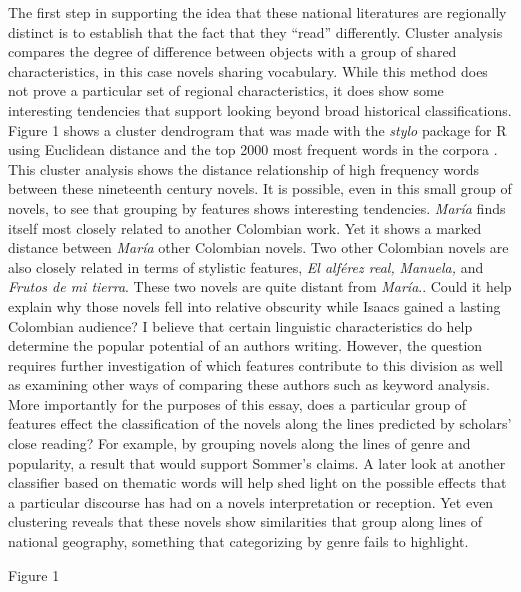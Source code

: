 The first step in supporting the idea that these national literatures are regionally distinct is to establish that the fact that they \enquote{read} differently.
Cluster analysis compares the degree of difference between objects with a group of shared characteristics, in this case novels sharing vocabulary.
While this method does not prove a particular set of regional characteristics, it does show some interesting tendencies that support looking beyond broad historical classifications. 
Figure 1 shows a cluster dendrogram that was made with the \textit{stylo} package for R using Euclidean distance and the top 2000 most frequent words in the corpora \autocite{Eder2013, RCT2014}.
This cluster analysis shows the distance relationship of high frequency words between these nineteenth century novels.
It is possible, even in this small group of novels, to see that grouping by features shows interesting tendencies. 
\textit{María} finds itself most closely related to another Colombian work.
Yet it shows a marked distance between \textit{María} other Colombian novels.
Two other Colombian novels are also closely related in terms of stylistic features, \textit{El alférez real,} \textit{Manuela,} and \textit{Frutos de mi tierra}.
These two novels are quite distant from \textit{María}..
Could it help explain why those novels fell into relative obscurity while Isaacs gained a lasting Colombian audience?
I believe that certain linguistic characteristics do help determine the popular potential of an authors writing.
However, the question requires further investigation of which features contribute to this division as well as examining other ways of comparing these authors such as keyword analysis.
More importantly for the purposes of this essay, does a particular group of features effect the classification of the novels along the lines predicted by scholars' close reading?
For example, by grouping novels along the lines of genre and popularity, a result that would support Sommer's claims.
A later look at another classifier based on thematic words will help shed light on the possible effects that a particular discourse has had on a novels interpretation or reception.
Yet even clustering reveals that these novels show similarities that group along lines of national geography, something that categorizing by genre fails to highlight.


Figure 1


